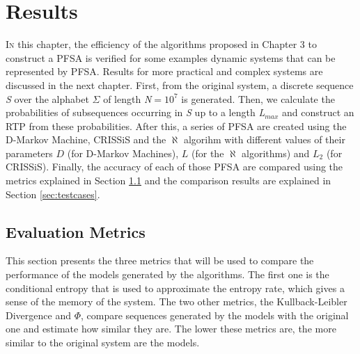 \chapter{Results}\label{cap:4}


{\lettrine[loversize=0.25,findent=0.2em,nindent=0em]{I}{n} this chapter, the efficiency of the algorithms proposed in Chapter 3 to construct a PFSA is verified for some examples dynamic systems that can be represented by PFSA. Results for more practical and complex systems are discussed in the next chapter. First, from the original system, a discrete sequence \textit{S} over the alphabet $\Sigma$ of length \textit{N}$=10^7$ is generated. Then, we calculate the probabilities of subsequences occurring in \textit{S} up to a length \textit{L}$_{max}$ and construct an RTP from these probabilities. After this, a series of PFSA are created using the D-Markov Machine, CRISSiS and the $\aleph$ algorihm with different values of their parameters $D$ (for D-Markov Machines), $L$ (for the $\aleph$ algorithms) and $L_2$ (for CRISSiS). Finally, the accuracy of each of those PFSA are compared using the metrics explained in Section \ref{sec:metrics} and the comparison results are explained in Section \ref{sec:testcases}.

\section{Evaluation Metrics}\label{sec:metrics}
%
%

This section presents the three metrics that will be used to compare the performance of the models generated by the algorithms. The first one is the conditional entropy that is used to approximate the entropy rate, which gives a sense of the memory of the system. The two other metrics, the Kullback-Leibler Divergence and $\Phi$, compare sequences generated by the models with the original one and estimate how similar they are. The lower these metrics are, the more similar to the original system are the models.

}

